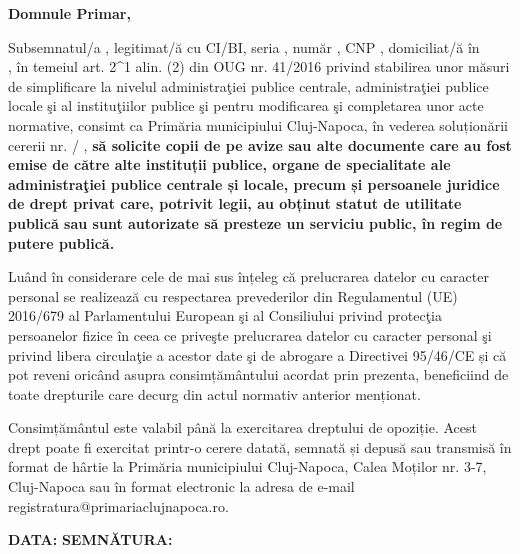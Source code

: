 \documentclass[11pt,a4paper]{article}
\newcommand{\fillline}[1][6cm]{\underline{\hspace{#1}}}
\newcommand{\fillbox}[1][0.4cm]{\framebox[#1]{\rule{0pt}{#1}}}
\begin{document}
\begin{center}
\textbf{Domnule Primar,}
\end{center}

\vspace{1cm}

\hspace{1cm}Subsemnatul/a \fillline[8cm], legitimat/ă cu CI/BI, seria \fillline[2cm], număr \fillline[4cm], CNP \fillbox \fillbox \fillbox \fillbox \fillbox \fillbox \fillbox \fillbox \fillbox \fillbox \fillbox \fillbox \fillbox, domiciliat/ă în \hrulefill\\
\hrulefill, în temeiul art. 2\textasciicircum 1 alin. (2) din OUG nr. 41/2016 privind stabilirea unor măsuri de simplificare la nivelul administraţiei publice centrale, administraţiei publice locale şi al instituţiilor publice şi pentru modificarea şi completarea unor acte normative, consimt ca Primăria municipiului Cluj-Napoca, în vederea soluționării cererii nr. \fillline[3cm] / \fillline[2cm], \textbf{să solicite copii de pe avize sau alte documente care au fost emise de către alte instituții publice, organe de specialitate ale administraţiei publice centrale și locale, precum și persoanele juridice de drept privat care, potrivit legii, au obținut statut de utilitate publică sau sunt autorizate să presteze un serviciu public, în regim de putere publică.}

\vspace{0.5cm}

\hspace{1cm}Luând în considerare cele de mai sus înțeleg că prelucrarea datelor cu caracter personal se realizează cu respectarea prevederilor din Regulamentul (UE) 2016/679 al Parlamentului European şi al Consiliului privind protecţia persoanelor fizice în ceea ce priveşte prelucrarea datelor cu caracter personal şi privind libera circulaţie a acestor date şi de abrogare a Directivei 95/46/CE și că pot reveni oricând asupra consimțământului acordat prin prezenta, beneficiind de toate drepturile care decurg din actul normativ anterior menționat.

\vspace{0.5cm}

\hspace{1cm}Consimțământul este valabil până la exercitarea dreptului de opoziție. Acest drept poate fi exercitat printr-o cerere datată, semnată și depusă sau transmisă în format de hârtie la Primăria municipiului Cluj-Napoca, Calea Moților nr. 3-7, Cluj-Napoca sau în format electronic la adresa de e-mail registratura@primariaclujnapoca.ro.

\vspace{2.5cm}

\textbf{DATA:} \fillline[4cm] \hfill \textbf{SEMNĂTURA:} \fillline[4cm]
\end{document}

